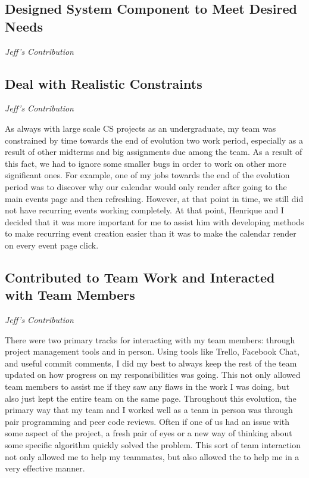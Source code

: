 \documentclass[11pt]{article}
\begin{document}
\subsection{Designed System Component to Meet Desired Needs}

\textit{Jeff's Contribution}

\subsection{Deal with Realistic Constraints}

\textit{Jeff's Contribution}

As always with large scale CS projects as an undergraduate, my team was constrained by time towards the end of evolution two work period, especially as a result of other midterms and big assignments due among the team.  As a result of this fact, we had to ignore some smaller bugs in order to work on other more significant ones.  For example, one of my jobs towards the end of the evolution period was to discover why our calendar would only render after going to the main events page and then refreshing.  However, at that point in time, we still did not have recurring events working completely.  At that point, Henrique and I decided that it was more important for me to assist him with developing methods to make recurring event creation easier than it was to make the calendar render on every event page click.

\subsection{Contributed to Team Work and Interacted with Team Members}

\textit{Jeff's Contribution}

There were two primary tracks for interacting with my team members: through project management tools and in person.  Using tools like Trello, Facebook Chat, and useful commit comments, I did my best to always keep the rest of the team updated on how progress on my responsibilities was going.  This not only allowed team members to assist me if they saw any flaws in the work I was doing, but also just kept the entire team on the same page.  Throughout this evolution, the primary way that my team and I worked well as a team in person was through pair programming and peer code reviews.  Often if one of us had an issue with some aspect of the project, a fresh pair of eyes or a new way of thinking about some specific algorithm quickly solved the problem.  This sort of team interaction not only allowed me to help my teammates, but also allowed the to help me in a very effective manner.
\end{document}
